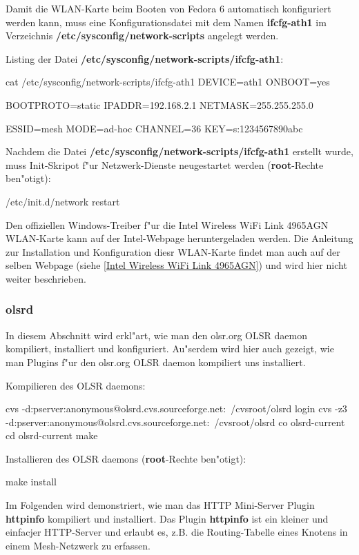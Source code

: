 Damit die WLAN-Karte beim Booten von Fedora 6
automatisch konfiguriert werden kann, muss eine Konfigurationsdatei
mit dem Namen \textbf{ifcfg-ath1} im Verzeichnis
\textbf{/etc/sysconfig/network-scripts} angelegt werden.

Listing der Datei \textbf{/etc/sysconfig/network-scripts/ifcfg-ath1}:
\begin{shelllst}
cat /etc/sysconfig/network-scripts/ifcfg-ath1
DEVICE=ath1
ONBOOT=yes
			
BOOTPROTO=static
IPADDR=192.168.2.1
NETMASK=255.255.255.0
			
ESSID=mesh
MODE=ad-hoc
CHANNEL=36
KEY=s:1234567890abc
\end{shelllst}

Nachdem die Datei \textbf{/etc/sysconfig/network-scripts/ifcfg-ath1}
erstellt wurde, muss Init-Skripot f"ur Netzwerk-Dienste neugestartet
werden (\textbf{root}-Rechte ben"otigt):
\begin{shelllst}
/etc/init.d/network restart
\end{shelllst}

Den offiziellen Windows-Treiber f"ur die Intel Wireless WiFi Link 4965AGN
WLAN-Karte kann auf der Intel-Webpage heruntergeladen werden. Die Anleitung
zur Installation und Konfiguration diesr WLAN-Karte findet man auch
auf der selben Webpage (siehe \ref{Intel Wireless WiFi Link 4965AGN}) und
wird hier nicht weiter beschrieben.

\subsubsection{olsrd}

In diesem Abschnitt wird erkl"art, wie man den olsr.org OLSR daemon kompiliert,
installiert und konfiguriert. Au"serdem wird hier auch gezeigt, wie man
Plugins f"ur den olsr.org OLSR daemon kompiliert uns installiert.

Kompilieren des OLSR daemons:
\begin{shelllst}
cvs -d:pserver:anonymous@olsrd.cvs.sourceforge.net:\
	/cvsroot/olsrd login
cvs -z3 -d:pserver:anonymous@olsrd.cvs.sourceforge.net:\
	/cvsroot/olsrd co olsrd-current
cd olsrd-current
make
\end{shelllst}

Installieren des OLSR daemons (\textbf{root}-Rechte ben"otigt):
\begin{shelllst}
make install
\end{shelllst}

Im Folgenden wird demonstriert, wie man
das HTTP Mini-Server Plugin \textbf{httpinfo} kompiliert und installiert.
Das Plugin \textbf{httpinfo} ist ein kleiner und einfacjer HTTP-Server und
erlaubt es, z.B. die Routing-Tabelle eines Knotens in einem Mesh-Netzwerk
zu erfassen.

